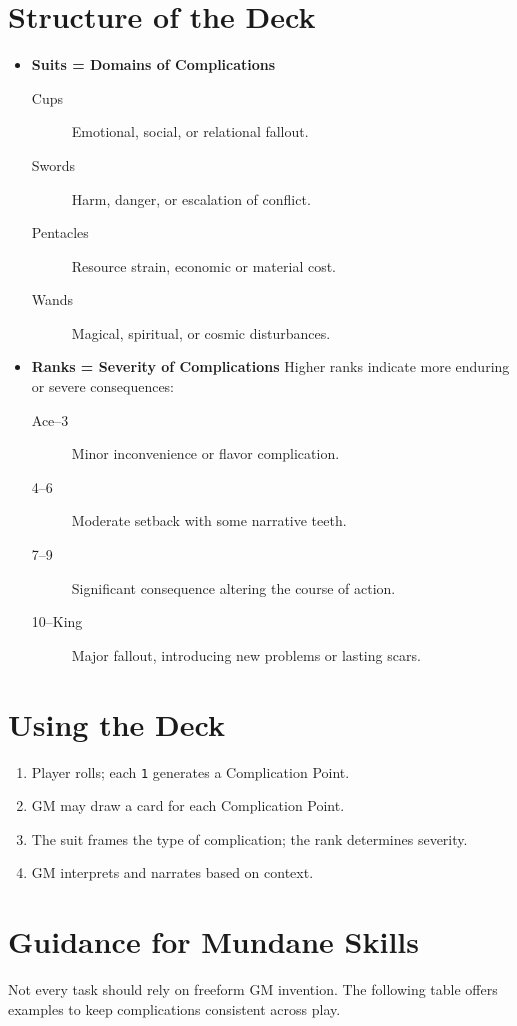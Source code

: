 \documentclass[12pt]{book}
\begin{document}
\section{Structure of the Deck}
\begin{itemize}
  \item \textbf{Suits = Domains of Complications}
    \begin{description}
      \item[ Cups] Emotional, social, or relational fallout.
      \item[ Swords] Harm, danger, or escalation of conflict.
      \item[ Pentacles] Resource strain, economic or material cost.
      \item[ Wands] Magical, spiritual, or cosmic disturbances.
    \end{description}
  \item \textbf{Ranks = Severity of Complications}  
  Higher ranks indicate more enduring or severe consequences:
  \begin{description}
    \item[Ace–3] Minor inconvenience or flavor complication.
    \item[4–6] Moderate setback with some narrative teeth.
    \item[7–9] Significant consequence altering the course of action.
    \item[10–King] Major fallout, introducing new problems or lasting scars.
  \end{description}
\end{itemize}

\section{Using the Deck}
\begin{enumerate}
  \item Player rolls; each \texttt{1} generates a Complication Point.
  \item GM may draw a card for each Complication Point.
  \item The suit frames the type of complication; the rank determines severity.
  \item GM interprets and narrates based on context.
\end{enumerate}

\section{Guidance for Mundane Skills}
Not every task should rely on freeform GM invention. The following table offers examples to keep complications consistent across play.
\end{document}
